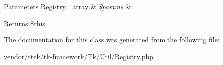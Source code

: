 \begin{DoxyParams}[1]{Parameters}
\hyperlink{classTk_1_1Util_1_1Registry}{Registry} | array & {\em \$params} & \\
\hline
\end{DoxyParams}
\begin{DoxyReturn}{Returns}
\$this 
\end{DoxyReturn}


The documentation for this class was generated from the following file\+:\begin{DoxyCompactItemize}
\item 
vendor/ttek/tk-\/framework/\+Tk/\+Util/Registry.\+php\end{DoxyCompactItemize}
